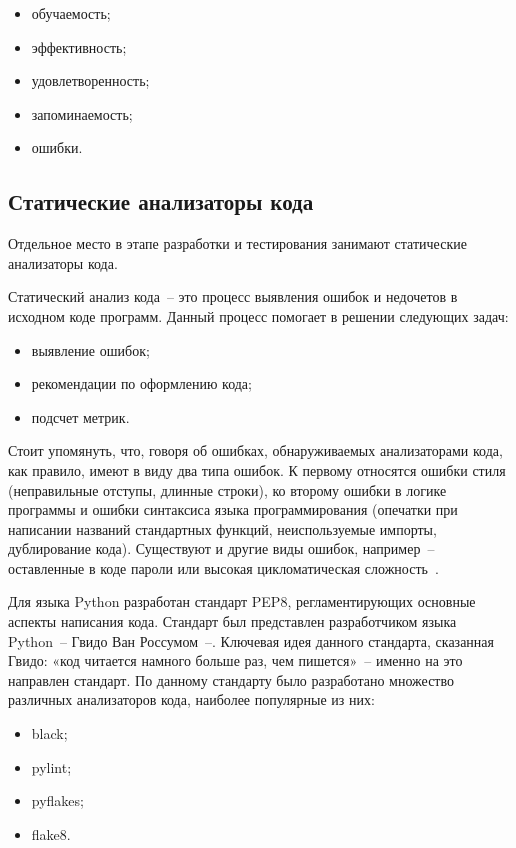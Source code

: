 \begin{itemize}
    \item обучаемость;
    \item эффективность;
    \item удовлетворенность;
    \item запоминаемость;
    \item ошибки.
\end{itemize}

\subsection{Статические анализаторы кода}

Отдельное место в этапе разработки и тестирования занимают 
статические анализаторы кода.

Статический анализ кода~-- это процесс выявления ошибок и недочетов 
в исходном коде программ. Данный процесс помогает в решении следующих 
задач:

\begin{itemize}
    \item выявление ошибок;
    \item рекомендации по оформлению кода;
    \item подсчет метрик.
\end{itemize}

Стоит упомянуть, что, говоря об ошибках, обнаруживаемых 
анализаторами кода, как правило, имеют в виду два типа ошибок. К первому 
относятся ошибки стиля (неправильные отступы, длинные строки), ко второму 
ошибки в логике программы и ошибки синтаксиса языка программирования 
(опечатки при написании названий стандартных функций, неиспользуемые 
импорты, дублирование кода). Существуют и другие виды ошибок, например~-- оставленные в коде пароли или высокая цикломатическая сложность~\cite{cyclomatic-complexity}.

Для языка Python разработан стандарт PEP8, регламентирующих 
основные аспекты написания кода. Стандарт был представлен разработчиком 
языка Python~-- Гвидо Ван Россумом~--. Ключевая идея данного стандарта, 
сказанная Гвидо: «код читается намного больше раз, чем пишется»~-- именно 
на это направлен стандарт. По данному стандарту было разработано 
множество различных анализаторов кода, наиболее популярные из них:

\begin{itemize}
    \item black;
    \item pylint;
    \item pyflakes;
    \item flake8.
\end{itemize}

